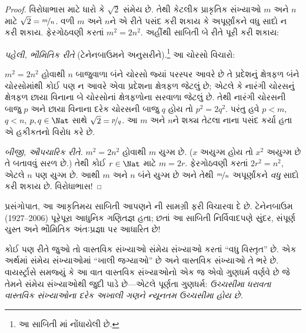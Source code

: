 \begin{proof}
વિરોધાભાસ માટે ધારો કે $\sqrt{2}$ સંમેય છે. તેથી કેટલીક પ્રાકૃતિક
સંખ્યાઓ $m$ અને $n$ માટે $\sqrt{2} = \nicefrac{m}{n}$. વળી $m$ અને
$n$ને એ રીતે પસંદ કરી શકાય કે અપૂર્ણાંકને વધુ સાદો ન કરી શકાય.
ફેરગોઠવણી કરતાં $m^{2} = 2n^{2}$. અહીંથી સાબિતી બે રીતે પૂરી કરી શકાય:

\emph{પહેલી, ભૌમિતિક રીતે} (ટેનેનબાઉમને અનુસરીને).\footnote{આ સાબિતી
\cite{Conway2006}માં નોંધાયેલી છે.} આ ચોરસો વિચારો:
\begin{center}
\end{center}
$m^2 = 2n^2$ હોવાથી $n$ બાજુવાળા બંને ચોરસો જ્યાં પરસ્પર આવરે છે
તે પ્રદેશનું ક્ષેત્રફળ બંને ચોરસોમાંથી કોઈ પણ ન આવરે એવા પ્રદેશના
ક્ષેત્રફળ જેટલું છે; એટલે કે નારંગી ચોરસનું ક્ષેત્રફળ છાયા વિનાના બે
ચોરસોનાં ક્ષેત્રફળોના સરવાળા જેટલું છે. તેથી નારંગી ચોરસની બાજુ $p$
અને છાયા વિનાના દરેક ચોરસની બાજુ $q$ હોય તો $p^2 = 2q^2$. પરંતુ હવે
$p < m$, $q < n$, $p, q \in \Nat$ સાથે
$\sqrt{2} = \nicefrac{p}{q}$. આ $m$ અને $n$ને શક્ય તેટલા નાના પસંદ
કર્યા હતા એ હકીકતનો વિરોધ કરે છે.

\emph{બીજી, ઔપચારિક રીતે.} $m^{2} = 2n^{2}$ હોવાથી $m$ યુગ્મ છે.
($x$ અયુગ્મ હોય તો $x^2$ અયુગ્મ છે તે બતાવવું સરળ છે.) તેથી કોઈ
$r \in \Nat$ માટે $m = 2r$. ફેરગોઠવણી કરતાં $2r^2 = n^2$,
એટલે $n$ પણ યુગ્મ છે. આથી $m$ અને $n$ બંને યુગ્મ છે અને તેથી
$\nicefrac{m}{n}$ અપૂર્ણાંકને \emph{વધુ} સાદો કરી શકાય છે.
વિરોધાભાસ!
\end{proof}

પ્રસંગોપાત, આ આકૃતિમય સાબિતી આપણને ની
સામગ્રી ફરી વિચારવા દે છે. ટેનેનબાઉમ (1927--2006) પૂરેપૂરા આધુનિક
ગણિતજ્ઞ હતા; છતાં આ સાબિતી નિર્વિવાદપણે સુંદર, સંપૂર્ણ ચુસ્ત અને
ભૌમિતિક અંતઃપ્રજ્ઞા પર આધારિત છે!

કોઈ પણ રીતે જુઓ તો વાસ્તવિક સંખ્યાઓ સંમેય સંખ્યાઓ કરતાં ``વધુ
વિસ્તૃત'' છે. એક અર્થમાં સંમેય સંખ્યાઓમાં ``ખાલી જગ્યાઓ'' છે અને
વાસ્તવિક સંખ્યાઓ તે ભરે છે. વાયર્સ્ટ્રાસે સમજ્યું કે આ વાત વાસ્તવિક
સંખ્યાઓનો એક જ એવો ગુણધર્મ વર્ણવે છે જે તેમને સંમેય સંખ્યાઓથી જુદી
પાડે છે—એટલે પૂર્ણતા ગુણધર્મ: \emph{ઉચ્ચસીમા ધરાવતા વાસ્તવિક
સંખ્યાઓના દરેક અખાલી ગણને ન્યૂનતમ ઉચ્ચસીમા હોય છે.}

